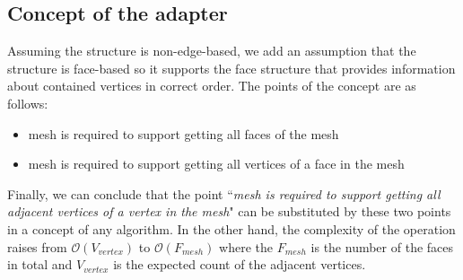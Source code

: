 \subsection{Concept of the adapter}

Assuming the structure is non-edge-based, we add an assumption that the structure is face-based
so it supports the face structure that provides information about contained vertices in correct
order. The points of the concept are as follows:

\begin{itemize}
\item mesh is required to support getting all faces of the mesh
\item mesh is required to support getting all vertices of a face in the mesh
\end{itemize}
Finally, we can conclude that the point ``\emph{mesh is required to support getting all adjacent vertices
of a vertex in the mesh}" can be substituted by these two points in a concept of any 
algorithm. In the other hand, the complexity of the operation raises from 
$\mathcal{O}(V_{vertex})$ to $\mathcal{O}(F_{mesh})$ where the $F_{mesh}$ is the number of the
faces in total and $V_{vertex}$ is the expected count of the adjacent vertices.